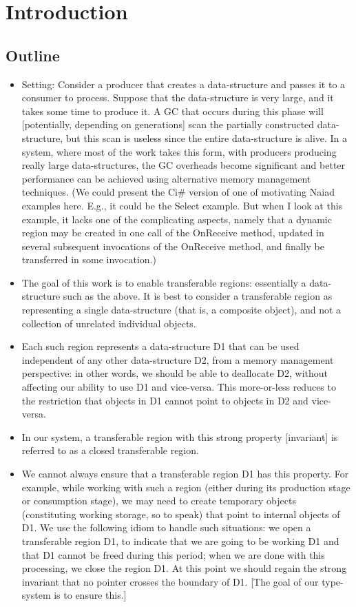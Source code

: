 \section{Introduction}
\label{sec:introduction}

\subsection*{Outline}

\begin{itemize}
\item
Setting: Consider a producer that creates a data-structure and passes it to a consumer to process. Suppose that the data-structure is very large, and it takes some time to produce it. A GC that occurs during this phase will [potentially, depending on generations] scan the partially constructed data-structure, but this scan is useless since the entire data-structure is alive. In a system, where most of the work takes this form, with producers producing really large data-structures, the GC overheads become significant and better performance can be achieved using alternative memory management techniques. (We could present the Ci\# version of one of motivating Naiad examples here. E.g., it could be the Select example. But when I look at this example, it lacks one of the complicating aspects, namely that a dynamic region may be created in one call of the OnReceive method, updated in several subsequent invocations of the OnReceive method, and finally be transferred in some invocation.)

\item
The goal of this work is to enable transferable regions: essentially a data-structure such as the above. It is best to consider a transferable region as representing a single data-structure (that is, a composite object), and not a collection of unrelated individual objects.

\item
Each such region represents a data-structure D1 that can be used independent of any other data-structure D2, from a memory management perspective: in other words, we should be able to deallocate D2, without affecting our ability to use D1 and vice-versa. This more-or-less reduces to the restriction that objects in D1 cannot point to objects in D2 and vice-versa.
\item
In our system, a transferable region with this strong property [invariant] is referred to as a closed transferable region.  

\item
We cannot always ensure that a transferable region D1 has this property. For example, while working with such a region (either during its production stage or consumption stage), we may need to create temporary objects (constituting working storage, so to speak) that point to internal objects of D1. We use the following idiom to handle such situations: we open a transferable region D1, to indicate that we are going to be working D1 and that D1 cannot be freed during this period; when we are done with this processing, we close the region D1. At this point we should regain the strong invariant that no pointer crosses the boundary of D1. [The goal of our type-system is to ensure this.]


\end{itemize}
